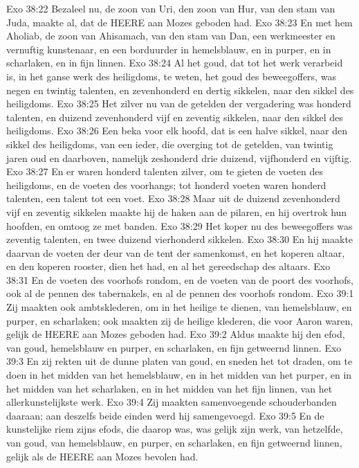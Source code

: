 Exo 38:22  Bezaleel nu, de zoon van Uri, den zoon van Hur, van den stam van Juda, maakte al, dat de HEERE aan Mozes geboden had.
Exo 38:23  En met hem Aholiab, de zoon van Ahisamach, van den stam van Dan, een werkmeester en vernuftig kunstenaar, en een borduurder in hemelsblauw, en in purper, en in scharlaken, en in fijn linnen.
Exo 38:24  Al het goud, dat tot het werk verarbeid is, in het ganse werk des heiligdoms, te weten, het goud des beweegoffers, was negen en twintig talenten, en zevenhonderd en dertig sikkelen, naar den sikkel des heiligdoms.
Exo 38:25  Het zilver nu van de getelden der vergadering was honderd talenten, en duizend zevenhonderd vijf en zeventig sikkelen, naar den sikkel des heiligdoms.
Exo 38:26  Een beka voor elk hoofd, dat is een halve sikkel, naar den sikkel des heiligdoms, van een ieder, die overging tot de getelden, van twintig jaren oud en daarboven, namelijk zeshonderd drie duizend, vijfhonderd en vijftig.
Exo 38:27  En er waren honderd talenten zilver, om te gieten de voeten des heiligdoms, en de voeten des voorhangs; tot honderd voeten waren honderd talenten, een talent tot een voet.
Exo 38:28  Maar uit de duizend zevenhonderd vijf en zeventig sikkelen maakte hij de haken aan de pilaren, en hij overtrok hun hoofden, en omtoog ze met banden.
Exo 38:29  Het koper nu des beweegoffers was zeventig talenten, en twee duizend vierhonderd sikkelen.
Exo 38:30  En hij maakte daarvan de voeten der deur van de tent der samenkomst, en het koperen altaar, en den koperen rooster, dien het had, en al het gereedschap des altaars.
Exo 38:31  En de voeten des voorhofs rondom, en de voeten van de poort des voorhofs, ook al de pennen des tabernakels, en al de pennen des voorhofs rondom.
Exo 39:1  Zij maakten ook ambtsklederen, om in het heilige te dienen, van hemelsblauw, en purper, en scharlaken; ook maakten zij de heilige klederen, die voor Aaron waren, gelijk de HEERE aan Mozes geboden had.
Exo 39:2  Aldus maakte hij den efod, van goud, hemelsblauw en purper, en scharlaken, en fijn getweernd linnen.
Exo 39:3  En zij rekten uit de dunne platen van goud, en sneden het tot draden, om te doen in het midden van het hemelsblauw, en in het midden van het purper, en in het midden van het scharlaken, en in het midden van het fijn linnen, van het allerkunstelijkste werk.
Exo 39:4  Zij maakten samenvoegende schouderbanden daaraan; aan deszelfs beide einden werd hij samengevoegd.
Exo 39:5  En de kunstelijke riem zijns efods, die daarop was, was gelijk zijn werk, van hetzelfde, van goud, van hemelsblauw, en purper, en scharlaken, en fijn getweernd linnen, gelijk als de HEERE aan Mozes bevolen had.

